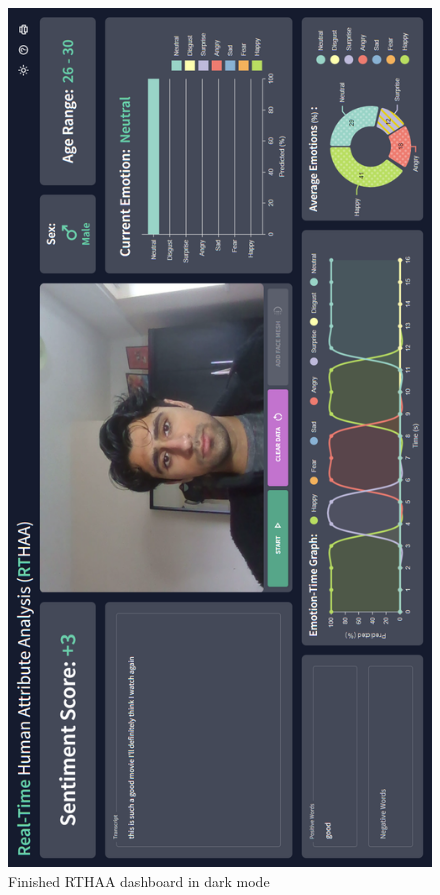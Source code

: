 \documentclass[12pt, a4paper]{article}
\begin{document}
\begin{appendices}
\begin{figure}[H]
    \centering
    \includegraphics[scale=0.58]{images/webappFE13.png}
    \caption{Finished RTHAA dashboard in dark mode}
    \label{fig:wa9}
\end{figure}


\end{appendices}
\end{document}
